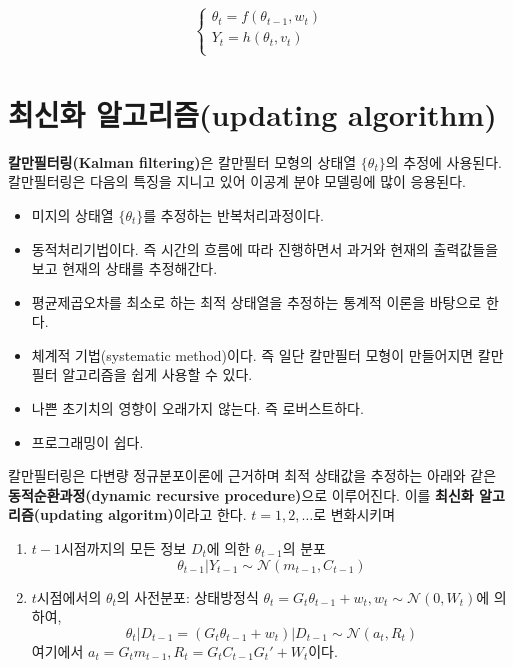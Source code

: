 \documentclass[b5paper,]{book}
\theoremstyle{definition}
\theoremstyle{definition}
\theoremstyle{definition}
\theoremstyle{remark}
\begin{document}
\[
\begin{cases}
\theta_{t}=f(\theta_{t-1},w_{t}) \\
Y_{t}=h(\theta_{t},v_{t})\\
\end{cases}
\]

\section{최신화 알고리즘(updating algorithm)}\label{-updating-algorithm}

\textbf{칼만필터링(Kalman filtering)}은 칼만필터 모형의 상태열
\(\{ \theta_{t}\}\)의 추정에 사용된다. 칼만필터링은 다음의 특징을 지니고
있어 이공계 분야 모델링에 많이 응용된다.

\begin{itemize}
\item
  미지의 상태열 \(\{\theta_{t}\}\)를 추정하는 반복처리과정이다.
\item
  동적처리기법이다. 즉 시간의 흐름에 따라 진행하면서 과거와 현재의
  출력값들을 보고 현재의 상태를 추정해간다.
\item
  평균제곱오차를 최소로 하는 최적 상태열을 추정하는 통계적 이론을
  바탕으로 한다.
\item
  체계적 기법(systematic method)이다. 즉 일단 칼만필터 모형이 만들어지면
  칼만필터 알고리즘을 쉽게 사용할 수 있다.
\item
  나쁜 초기치의 영향이 오래가지 않는다. 즉 로버스트하다.
\item
  프로그래밍이 쉽다.
\end{itemize}

칼만필터링은 다변량 정규분포이론에 근거하며 최적 상태값을 추정하는
아래와 같은 \textbf{동적순환과정(dynamic recursive procedure)}으로
이루어진다. 이를 \textbf{최신화 알고리즘(updating algoritm)}이라고 한다.
\(t=1,2,\ldots\)로 변화시키며

\begin{enumerate}
\def\labelenumi{\arabic{enumi}.}
\item
  \(t-1\)시점까지의 모든 정보 \(D_{t}\)에 의한 \(\theta_{t-1}\)의 분포
  \[\theta_{t-1}|Y_{t-1} \sim \mathcal{N}(m_{t-1},C_{t-1})\]
\item
  \(t\)시점에서의 \(\theta_{t}\)의 사전분포: 상태방정식
  \(\theta_{t}=G_{t}\theta_{t-1}+w_{t}, w_{t} \sim \mathcal{N}(0,W_{t})\)에
  의하여,
  \[\theta_{t}|D_{t-1} = (G_{t}\theta_{t-1}+w_{t})|D_{t-1}\sim \mathcal{N}(a_{t},R_{t})\]
  여기에서 \(a_{t}=G_{t}m_{t-1}, R_{t}=G_{t}C_{t-1}G_{t}'+W_{t}\)이다.
\end{enumerate}
\end{document}
